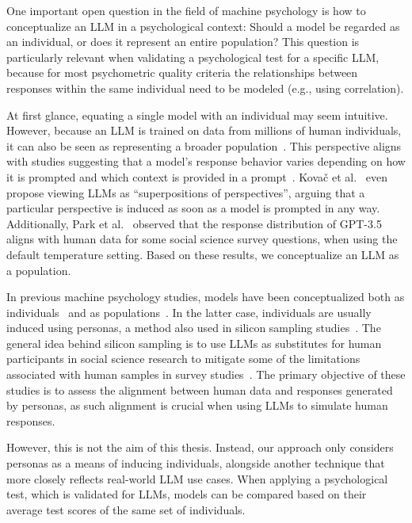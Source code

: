\documentclass{DESSThesis}
\begin{document}
One important open question in the field of machine psychology is how to conceptualize an LLM in a psychological context: Should a model be regarded as an individual, or does it represent an entire population? This question is particularly relevant when validating a psychological test for a specific LLM, because for most psychometric quality criteria the relationships between responses within the same individual need to be modeled (e.g., using correlation).

At first glance, equating a single model with an individual may seem intuitive.  However, because an LLM is trained on data from millions of human individuals, it can also be seen as representing a broader population~\cite{binz_using_2023, lohn_is_2024}. This perspective aligns with studies suggesting that a model’s response behavior varies depending on how it is prompted and which context is provided in a prompt~\cite{arora_probing_2023, kovac_large_2023, xu_expertprompting_2025}. Kova\v{c} et al.~\cite{kovac_large_2023} even propose viewing LLMs as ``superpositions of perspectives'', arguing that a particular perspective is induced as soon as a model is prompted in any way. Additionally, Park et al.~\cite{park_diminished_2024} observed that the response distribution of GPT-3.5 aligns with human data for some social science survey questions, when using the default temperature setting. 
Based on these results, we conceptualize an LLM as a population.

In previous machine psychology studies, models have been conceptualized both as individuals~\cite{binz_using_2023, coda-forno_inducing_2023, huang_humanity_2023, miotto_who_2022} and as populations~\cite{dorner_personality_2023, serapio-garcia_personality_2023}. In the latter case, individuals are usually induced using personas, a method also used in silicon sampling studies~\cite{argyle_out_2023, bisbee_synthetic_2024, petrov_limited_2024}. The general idea behind silicon sampling is to use LLMs as substitutes for human participants in social science research to mitigate some of the limitations associated with human samples in survey studies~\cite{bail_can_2024}. The primary objective of these studies is to assess the alignment between human data and responses generated by personas, as such alignment is crucial when using LLMs to simulate human responses. 

However, this is not the aim of this thesis. Instead, our approach only considers personas as a means of inducing individuals, alongside another technique that more closely reflects real-world LLM use cases. When applying a psychological test, which is validated for LLMs, models can be compared based on their average test scores of the same set of individuals.
\end{document}
